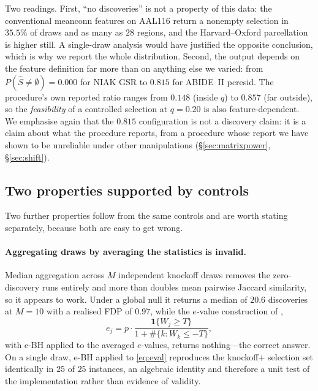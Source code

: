 \documentclass[11pt,a4paper]{article}
\begin{document}
\noindent
Two readings. First, ``no discoveries'' is not a property of this data: the
conventional meanconn features on AAL116 return a nonempty selection in
$35.5\%$ of draws and as many as $28$ regions, and the Harvard--Oxford
parcellation is higher still. A single-draw analysis would have justified
the opposite conclusion, which is why we report the whole distribution. Second, the output depends on the feature definition far more
than on anything else we varied: from $P(\hat S\ne\emptyset)=0.000$ for NIAK
GSR to $0.815$ for ABIDE~II pcresid. The procedure's own reported ratio
ranges from $0.148$ (inside $q$) to $0.857$ (far outside), so the
\emph{feasibility} of a controlled selection at $q=0.20$ is also
feature-dependent. We emphasise again that the $0.815$ configuration is not
a discovery claim: it is a claim about what the procedure reports, from a
procedure whose report we have shown to be unreliable under other
manipulations (\S\ref{sec:matrixpower}, \S\ref{sec:shift}).

\subsection{Two properties supported by controls}
\label{sec:retained}

Two further properties follow from the same controls and are worth stating
separately, because both are easy to get wrong.

\paragraph{Aggregating draws by averaging the statistics is invalid.}
Median aggregation across $M$ independent knockoff draws removes the
zero-discovery runs entirely and more than doubles mean pairwise Jaccard
similarity, so it appears to work. Under a global null it returns a median
of $20.6$ discoveries at $M=10$ with a realised FDP of $0.97$, while the
$e$-value construction of \citet{ren2024derandomised},
\begin{equation}
  e_j = p\cdot\frac{\mathbf{1}\{W_j\ge T\}}{1+\#\{k:W_k\le -T\}},
  \label{eq:eval}
\end{equation}
with e-BH \citep{wang2022ebh} applied to the averaged $e$-values, returns
nothing---the correct answer. On a single draw, e-BH applied to
\eqref{eq:eval} reproduces the knockoff$+$ selection set identically in
$25$ of $25$ instances, an algebraic identity and therefore a unit test of
the implementation rather than evidence of validity.
\end{document}
